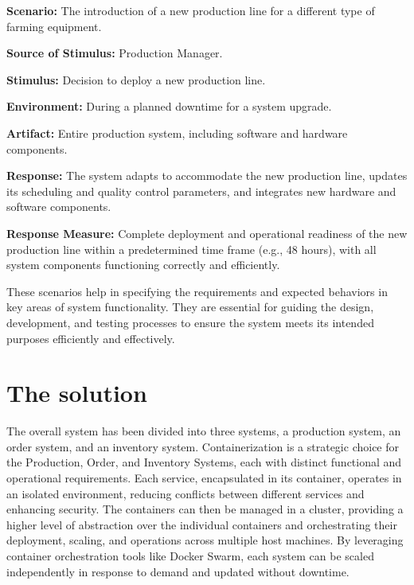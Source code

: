 \documentclass[conference]{IEEEtran}
\begin{document}
\textbf{Scenario:} The introduction of a new production line for a different type of farming equipment.

\textbf{Source of Stimulus:} Production Manager.

\textbf{Stimulus:} Decision to deploy a new production line.

\textbf{Environment:} During a planned downtime for a system upgrade.

\textbf{Artifact:} Entire production system, including software and hardware components.

\textbf{Response:} The system adapts to accommodate the new production line, updates its scheduling and quality control parameters, and integrates new hardware and software components.

\textbf{Response Measure:} Complete deployment and operational readiness of the new production line within a predetermined time frame (e.g., 48 hours), with all system components functioning correctly and efficiently.

These scenarios help in specifying the requirements and expected behaviors in key areas of system functionality. They are essential for guiding the design, development, and testing processes to ensure the system meets its intended purposes efficiently and effectively.


\section{The solution}
\label{sec:middleware_architecture}


The overall system has been divided into three systems, a production system, an order system, and an inventory system. Containerization is a strategic choice for the Production, Order, and Inventory Systems, each with distinct functional and operational requirements. Each service, encapsulated in its container, operates in an isolated environment, reducing conflicts between different services and enhancing security. The containers can then be managed in a cluster, providing a higher level of abstraction over the individual containers and orchestrating their deployment, scaling, and operations across multiple host machines. By leveraging container orchestration tools like Docker Swarm, each system can be scaled independently in response to demand and updated without downtime.
\end{document}
